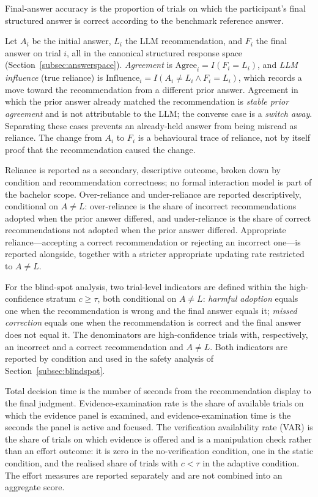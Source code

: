 \documentclass[oneside,final,14pt,a4paper]{extreport}
\begin{document}
Final-answer accuracy is the proportion of trials on which the participant's
final structured answer is correct according to the benchmark reference answer.

Let $A_i$ be the initial answer, $L_i$ the LLM recommendation, and $F_i$ the
final answer on trial $i$, all in the canonical structured response space
(Section~\ref{subsec:answerspace}). \emph{Agreement} is
$\text{Agree}_i=I(F_i=L_i)$, and \emph{LLM influence} (true reliance) is
$\text{Influence}_i=I(A_i\neq L_i \land F_i=L_i)$, which records a move toward
the recommendation from a different prior answer. Agreement in which the prior
answer already matched the recommendation is \emph{stable prior agreement} and
is not attributable to the LLM; the converse case is a \emph{switch away}.
Separating these cases prevents an already-held answer from being misread as
reliance. The change from $A_i$ to $F_i$ is a behavioural trace of reliance, not
by itself proof that the recommendation caused the change.

Reliance is reported as a secondary, descriptive outcome, broken down by
condition and recommendation correctness; no formal interaction model is part
of the bachelor scope. Over-reliance and under-reliance are reported
descriptively,
conditional on $A\neq L$: over-reliance is the share of incorrect
recommendations adopted when the prior answer differed, and under-reliance is
the share of correct recommendations not adopted when the prior answer differed.
Appropriate reliance---accepting a correct recommendation or rejecting an
incorrect one---is reported alongside, together with a stricter appropriate
updating rate restricted to $A\neq L$.

For the blind-spot analysis, two trial-level indicators are defined within the
high-confidence stratum $c\geq\tau$, both conditional on $A\neq L$:
\emph{harmful adoption} equals one when the recommendation is wrong and the
final answer equals it; \emph{missed correction} equals one when the
recommendation is correct and the final answer does not equal it. The
denominators are high-confidence trials with, respectively, an incorrect and a
correct recommendation and $A\neq L$. Both indicators are reported by condition
and used in the safety analysis of Section~\ref{subsec:blindspot}.

Total decision time is the number of seconds from the recommendation display to
the final judgment. Evidence-examination rate is the share of available trials
on which the evidence panel is examined, and evidence-examination time is the
seconds the panel is active and focused. The verification availability rate
(VAR) is the share of trials on which evidence is offered and is a manipulation
check rather than an effort outcome: it is zero in the no-verification
condition, one in the static condition, and the realised share of trials with
$c<\tau$ in the adaptive condition. The effort measures are reported separately
and are not combined into an aggregate score.
\end{document}
